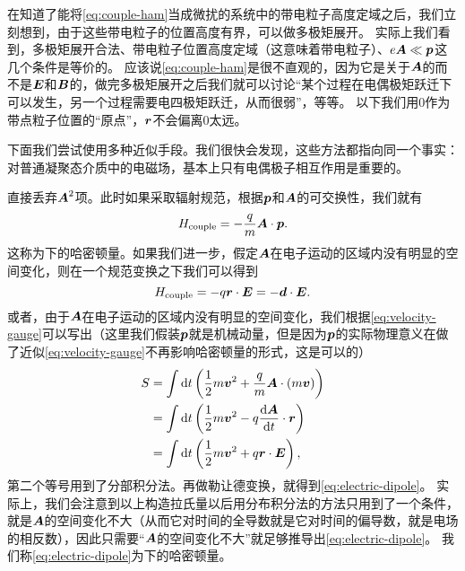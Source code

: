在知道了能将\eqref{eq:couple-ham}当成微扰的系统中的带电粒子高度定域之后，我们立刻想到，由于这些带电粒子的位置高度有界，可以做多极矩展开。
实际上我们看到，多极矩展开合法、带电粒子位置高度定域（这意味着带电粒子）、$e \vb*{A} \ll \vb*{p}$这几个条件是等价的。
应该说\eqref{eq:couple-ham}是很不直观的，因为它是关于$\vb*{A}$的而不是$\vb*{E}$和$\vb*{B}$的，做完多极矩展开之后我们就可以讨论“某个过程在电偶极矩跃迁下可以发生，另一个过程需要电四极矩跃迁，从而很弱”，等等。
以下我们用$0$作为带点粒子位置的“原点”，$\vb*{r}$不会偏离$0$太远。

下面我们尝试使用多种近似手段。我们很快会发现，这些方法都指向同一个事实：对普通凝聚态介质中的电磁场，基本上只有电偶极子相互作用是重要的。

直接丢弃$\vb*{A}^2$项。此时如果采取辐射规范，根据$\vb*{p}$和$\vb*{A}$的可交换性，我们就有
\begin{equation}
    H_\text{couple} = - \frac{q}{m} \vb*{A} \cdot \vb*{p}.
    \label{eq:velocity-gauge}
\end{equation}
这称为下的哈密顿量。如果我们进一步，假定$\vb*{A}$在电子运动的区域内没有明显的空间变化，则在一个规范变换之下我们可以得到
\begin{equation}
    H_\text{couple} = - q \vb*{r} \cdot \vb*{E} = - \vb*{d} \cdot \vb*{E}.
    \label{eq:electric-dipole}
\end{equation}
或者，由于$\vb*{A}$在电子运动的区域内没有明显的空间变化，我们根据\eqref{eq:velocity-gauge}可以写出（这里我们假装$\vb*{p}$就是机械动量，但是因为$\vb*{p}$的实际物理意义在做了近似\eqref{eq:velocity-gauge}不再影响哈密顿量的形式，这是可以的）
\[
    \begin{aligned}
        S &= \int \dd{t} \left( \frac{1}{2} m \vb*{v}^2 + \frac{q}{m} \vb*{A} \cdot (m \vb*{v}) \right) \\
        &= \int \dd{t} \left( \frac{1}{2} m \vb*{v}^2 - q \dv{\vb*{A}}{t} \cdot \vb*{r} \right) \\
        &= \int \dd{t} \left( \frac{1}{2} m \vb*{v}^2 + q \vb*{r} \cdot \vb*{E} \right),
    \end{aligned} 
\]
第二个等号用到了分部积分法。再做勒让德变换，就得到\eqref{eq:electric-dipole}。
实际上，我们会注意到以上构造拉氏量以后用分布积分法的方法只用到了一个条件，就是$\vb*{A}$的空间变化不大（从而它对时间的全导数就是它对时间的偏导数，就是电场的相反数），因此只需要“$\vb*{A}$的空间变化不大”就足够推导出\eqref{eq:electric-dipole}。
我们称\eqref{eq:electric-dipole}为下的哈密顿量。

